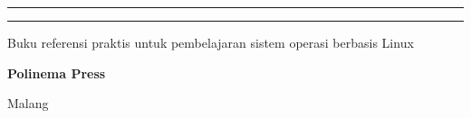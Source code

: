 \begin{titlepage}
    \vfill

    \begin{minipage}{1\textwidth}
        \centering
        \rule{0.28\textwidth}{0.6pt}\hspace{0.03\textwidth}\rule{0.28\textwidth}{0.6pt}\par
        \vspace{0.35cm}
        {\small\sffamily Buku referensi praktis untuk pembelajaran sistem operasi berbasis Linux\par}
        \vspace{0.75cm}
        {\normalsize\bfseries Polinema Press\par}
        {\normalsize Malang \textbullet{} \the\year\par}
    \end{minipage}

\end{titlepage}

\cleardoublepage
